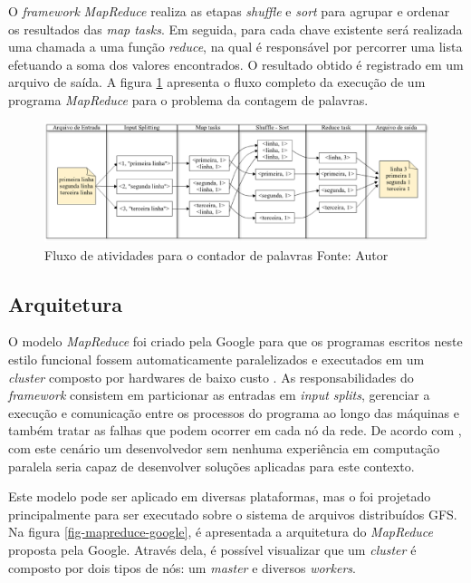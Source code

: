 O \textit{framework} \textit{MapReduce} realiza as etapas \textit{shuffle} e \textit{sort} para agrupar e ordenar os resultados das \textit{map tasks}. Em seguida, para cada chave existente será realizada uma chamada a uma função \textit{reduce}, na qual é responsável por percorrer uma lista efetuando a soma dos valores encontrados. O resultado obtido é registrado em um arquivo de saída. A figura \ref{fig-mapreduce-word-count} apresenta o fluxo completo da execução de um programa \textit{MapReduce} para o problema da contagem de palavras.

\begin{figure}[ht!]
	\centering
	\includegraphics[keepaspectratio=true,scale=0.36]
	  {figuras/mapreduce-word-count.eps}
	\caption[Fluxo de atividades para o contador de palavras]{Fluxo de atividades para o contador de palavras
	\protect\linebreak Fonte: Autor}
	\label{fig-mapreduce-word-count}
\end{figure}
\FloatBarrier

\subsection{Arquitetura}

O modelo \textit{MapReduce} foi criado pela Google para que os programas escritos neste estilo funcional fossem automaticamente paralelizados e executados em um \textit{cluster} composto por hardwares de baixo custo \cite{ghemawatMapreduce2008}. As responsabilidades do \textit{framework} consistem em particionar as entradas em \textit{input splits}, gerenciar a execução e comunicação entre os processos do programa ao longo das máquinas e também tratar as falhas que podem ocorrer em cada nó da rede. De acordo com , com este cenário um desenvolvedor sem nenhuma experiência em computação paralela seria capaz de desenvolver soluções aplicadas para este contexto. 

Este modelo pode ser aplicado em diversas plataformas, mas o foi projetado principalmente para ser executado sobre o sistema de arquivos distribuídos GFS. Na figura \ref{fig-mapreduce-google}, é apresentada a arquitetura do \textit{MapReduce} proposta pela Google. Através dela, é possível visualizar que um \textit{cluster} é composto por dois tipos de nós: um \textit{master} e diversos \textit{workers}.

